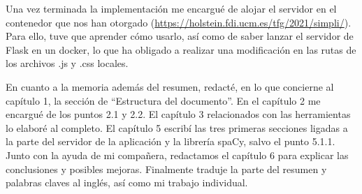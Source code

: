 Una vez terminada la implementación me encargué de alojar el servidor en el contenedor que nos han otorgado (\url{https://holstein.fdi.ucm.es/tfg/2021/simpli/}). Para ello, tuve que aprender cómo usarlo, así como de saber lanzar el servidor de Flask en un docker, lo que ha obligado a realizar una modificación en las rutas de los archivos .js y .css locales.

En cuanto a la memoria además del resumen, redacté, en lo que concierne al capítulo 1, la sección de ``Estructura del documento''. En el capítulo 2  me encargué de los puntos 2.1 y 2.2. El capítulo 3 relacionados con las herramientas lo elaboré al completo. El capítulo 5 escribí las tres primeras secciones ligadas a la parte del servidor de la aplicación y la librería spaCy, salvo el punto 5.1.1. Junto con la ayuda de mi compañera, redactamos el capítulo 6 para explicar las conclusiones y posibles mejoras. Finalmente traduje la parte del resumen y palabras claves al inglés, así como mi trabajo individual.



